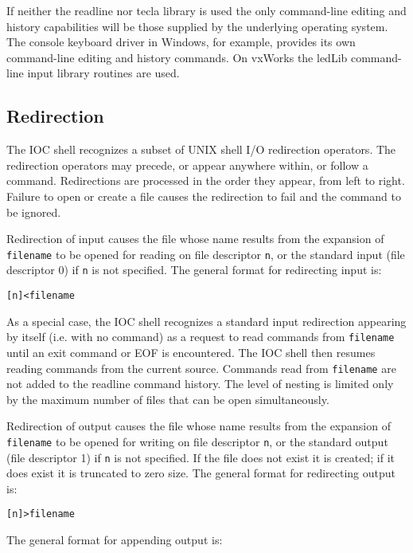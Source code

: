 If neither the readline nor tecla library is used the only command-line editing and history capabilities will be those supplied by the underlying operating system.
The console keyboard driver in Windows, for example, provides its own command-line editing and history commands.
On vxWorks the ledLib command-line input library routines are used.

\subsection{Redirection}

The IOC shell recognizes a subset of UNIX shell I/O redirection operators.
The redirection operators may precede, or appear anywhere within, or follow a command.
Redirections are processed in the order they appear, from left to right.
Failure to open or create a file causes the redirection to fail and the command to be ignored.

Redirection of input causes the file whose name results from the  expansion  of \verb|filename| to be  opened for reading on file descriptor \verb|n|, or the standard input (file descriptor 0) if \verb|n| is not specified.
The general format for redirecting input is:

\begin{verbatim}
[n]<filename
\end{verbatim}

As a special case, the IOC shell recognizes a standard input redirection appearing by itself (i.e. with no command) as a request to read commands from \verb|filename| until an exit command or EOF is encountered.
The IOC shell then resumes reading commands from the current source.
Commands read from \verb|filename| are not added to the readline command history.
The level of nesting is limited only by the maximum number of files that can be open simultaneously.

Redirection of output causes the file whose name results from the expansion of \verb|filename| to be opened for writing on file descriptor \verb|n|, or the standard output (file descriptor 1) if \verb|n| is not specified.
If the file does not exist it is created; if it does exist it is truncated to zero size.
The general format for redirecting output is:

\begin{verbatim}
[n]>filename
\end{verbatim}

 The general format for appending output is:

